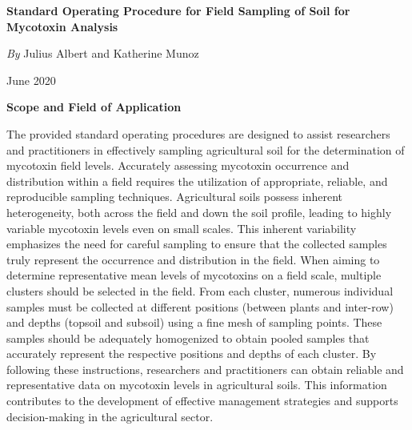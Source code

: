 \begin{refsection}
\begin{center} 
\HRule 
\vspace{0.2cm}
\Huge \textbf{Standard Operating Procedure for Field Sampling of Soil for Mycotoxin Analysis}
\vspace{0.2cm}
\HRule 
\end{center}

\vspace{2cm}
\begin{center} 
\LARGE \textit{By} Julius Albert and Katherine  Munoz


\LARGE June 2020
\end{center}

\clearpage





\noindent\large{\textbf{Scope and Field of Application}}


The provided standard operating procedures are designed to assist researchers and practitioners in effectively sampling agricultural soil for the determination of mycotoxin field levels.  Accurately assessing mycotoxin occurrence and distribution within a field requires the utilization of appropriate, reliable, and reproducible sampling techniques. Agricultural soils possess inherent heterogeneity, both across the field and down the soil profile, leading to highly variable mycotoxin levels even on small scales. This inherent variability emphasizes the need for careful sampling to ensure that the collected samples truly represent the occurrence and distribution in the field. When aiming to determine representative mean levels of mycotoxins on a field scale, multiple clusters should be selected in the field. From each cluster, numerous individual samples must be collected at different positions (between plants and inter-row) and depths (topsoil and subsoil) using a fine mesh of sampling points. These samples should be adequately homogenized to obtain pooled samples that accurately represent the respective positions and depths of each cluster. By following these instructions, researchers and practitioners can obtain reliable and representative data on mycotoxin levels in agricultural soils. This information contributes to the development of effective management strategies and supports decision-making in the agricultural sector.


\end{refsection}

